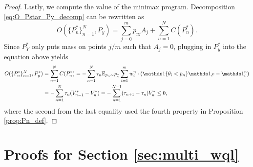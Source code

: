 \begin{proof}
  Lastly, we compute the value of the minimax program. Decomposition \eqref{eq:O_Pstar_Py_decomp} can be rewritten as 
  \[
  O(\{P_n^*\}_{n=1}^N, P_y) = \sum_{j=0}^m p_{yj} A_j + \sum_{n=1}^N C(P_n^*).
  \]
  Since $P_Y^*$ only puts mass on points $j/m$ such that $A_j = 0$, plugging in $P_y^*$ into the equation above yields
  \begin{align*}
  O(\{P_n^*\}_{n=1}^N, P_y^*) 
  &= \sum_{n=1}^N C(P_n^*) = -\sum_{n=1}^N \tau_n \E_{p_n \sim P_n^*} \sum_{i=1}^{m} w_i^n \cdot (\indi{\theta_i < p_n}\one_F - \one_i^n) \\
  &  = -\sum_{n=1}^N \tau_n (V_{n-1}^* - V_n^*) = -\sum_{n=1}^{N-1}(\tau_{n+1}-\tau_n)V_n^* \leq 0,
  \end{align*}
  where the second from the last equality used the fourth property in Proposition \ref{prop:Pn_def}.
\end{proof}



\section{Proofs for Section \ref{sec:multi_wql}}
